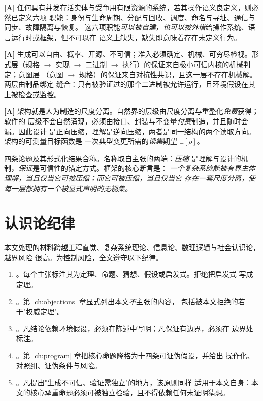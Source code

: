 \begin{principle}[必然性论题]\label{th:necessity}\textbf{[A]}
任何具有并发存活实体与受争用有限资源的系统，若其操作语义良定义，则必然已定义六项
职能：身份与生命周期、分配与回收、调度、命名与寻址、通信与同步、故障隔离与恢复。
这六项职能\emph{可以被自建，也可以被外借}给操作系统、语言运行时或框架，但不可以在
语义上缺失，缺失即意味着存在未定义行为。
\end{principle}

\begin{principle}[分离论题]\label{th:separation}\textbf{[A]}
生成可以自由、概率、开源、不可信；准入必须确定、机械、可穷尽检视。形式层（规格
$\to$ 实现 $\to$ 二进制 $\to$ 执行）的保证来自极小可信内核的机械判定；意图层
（意图 $\to$ 规格）的保证来自对抗性共识，且这一层不存在机械解。两层由制品绑定
缝合：只有被验证过的那个二进制被允许运行，且环境假设在其上被检查或监控。
\end{principle}

\begin{principle}[设计论题]\label{th:design}\textbf{[A]}
架构就是人为制造的尺度分离。自然界的层级由尺度分离与重整化\emph{免费}获得；软件的
层级不会自然涌现，必须由接口、封装与不变量\emph{付费}制造，并且随时会漏。因此设计
是正向压缩，理解是逆向压缩，两者是同一结构的两个读取方向。架构的可测量目标函数是
一次典型变更所需的\emph{读集}期望 $\mathbb{E}[\rho]$。
\end{principle}

四条论题及其形式化结果合称。名称取自主张的两端：\emph{压缩}
是理解与设计的机制，\emph{保证}是可信性的锚定方式。框架的核心断言是：
\emph{一个复杂系统能被有界主体理解，当且仅当它可被压缩；而它可被压缩，当且仅当它
存在一套尺度分离，使每一层都拥有一个被显式声明的无视集。}

\section{认识论纪律}

本文处理的材料跨越工程直觉、复杂系统理论、信息论、数理逻辑与社会认识论，越界风险
很高。为控制风险，全文遵守以下纪律。

\begin{enumerate}[label=(\roman*)]
\item {}。每个主张标注其为定理、命题、猜想、假设或启发式。拒绝把启发式
      写成定理。
\item {}。第 \ref{ch:objections} 章显式列出本文\emph{不}主张的内容，
      包括被本文拒绝的若干"权威定理"。
\item {}。凡结论依赖环境假设，必须在陈述中写明；凡保证有边界，必须在
      边界处标注。
\item {}。第 \ref{ch:program} 章把核心命题降格为十四条可证伪假设，并给出
      操作化、对照组、证伪条件与风险。
\item {}。凡提出"生成不可信、验证需独立"的地方，该原则同样
      适用于本文自身：本文的核心承重命题必须可被独立检验，且不得依赖任何未证明猜想。
\end{enumerate}

